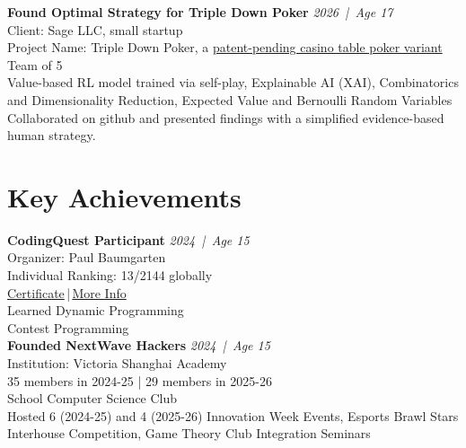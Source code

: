 \documentclass[a4paper,9pt]{extarticle}
\newcommand{\entryheader}[3]{%
    \noindent\textbf{#1} \hfill \textit{#2 \,|\, Age #3}
}
\begin{document}
    \noindent
    \entryheader{Found Optimal Strategy for Triple Down Poker}{2026}{17} \\
    Client: Sage LLC, small startup \\
    Project Name: Triple Down Poker, a \href{https://tripledown.poker/}{patent-pending casino table poker variant}\\
    Team of 5 \\
    Value-based RL model trained via self-play, Explainable AI (XAI), Combinatorics and Dimensionality Reduction, Expected Value and Bernoulli Random Variables\\
    Collaborated on github and presented findings with a simplified evidence-based human strategy.

\section*{Key Achievements}
    \noindent
    \entryheader{CodingQuest Participant}{2024}{15} \\
    Organizer: Paul Baumgarten \\
    Individual Ranking: 13/2144 globally \\
    \href{https://github.com/godCoderXYZ/CV/blob/main/public/CodingQuest/certificate-Y11V1MicahSHAW-2024challenge.pdf}{Certificate}\,|\,\href{https://github.com/godCoderXYZ/CV/blob/main/public/CodingQuest/codingquest.pdf}{More Info} \\
    Learned Dynamic Programming \\
    Contest Programming \\

    \noindent
    \entryheader{Founded NextWave Hackers}{2024}{15} \\
    Institution: Victoria Shanghai Academy \\
    35 members in 2024-25 | 29 members in 2025-26 \\
    School Computer Science Club \\
    Hosted 6 (2024-25) and 4 (2025-26) Innovation Week Events, Esports Brawl Stars Interhouse Competition, Game Theory Club Integration Seminars \\

\end{document}
